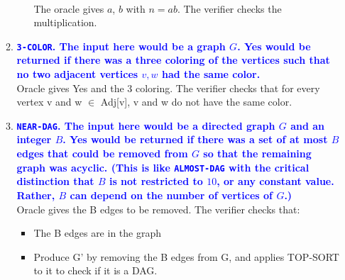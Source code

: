 \documentclass[11pt]{article}
\begin{document}
\begin{enumerate}
\begin{enumerate}
\begin{enumerate}
            \\ The oracle gives $a$, $b$ with $n = ab$. The verifier checks the multiplication.
        \end{enumerate}
    \item \textbf{\textcolor{blue}{{\tt 3-COLOR}. The input here would be a graph $G$. Yes would be returned if there was a three coloring of the vertices such that no two adjacent vertices $v,w$ had the same color.}}
        \\ Oracle gives Yes and the 3 coloring. The verifier checks that for every vertex v and w $\in$ Adj[v], v and w do not have the same color.
    \item \textbf{\textcolor{blue}{{\tt NEAR-DAG}. The input here would be a directed graph $G$ and an integer $B$. Yes would be returned if there was a set of at most $B$ edges that could be removed from $G$ so that the remaining graph was acyclic. (This is like {\tt ALMOST-DAG} with the critical distinction that $B$ is not restricted to $10$, or any constant value. Rather, $B$ can depend on the number of vertices of $G$.)}}
        \\ Oracle gives the B edges to be removed. The verifier checks that:
        \begin{itemize}
            \item The B edges are in the graph
            \item Produce G' by removing the B edges from G, and applies TOP-SORT to it to check if it is a DAG.
        \end{itemize}
\end{enumerate}
    

\end{enumerate}
\end{document}
